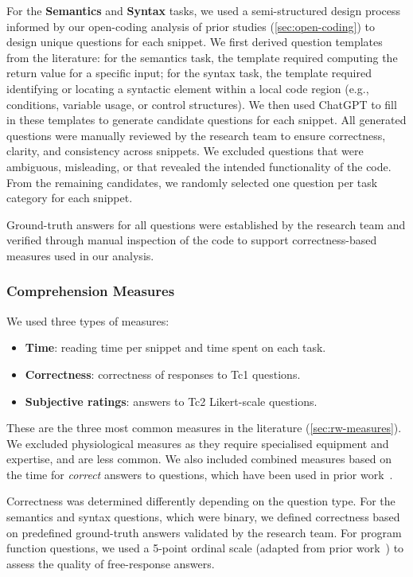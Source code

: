 For the \textbf{Semantics} and \textbf{Syntax} tasks, we used a semi-structured design process informed by our open-coding analysis of prior studies (\cref{sec:open-coding})
to design unique questions for each snippet.
We first derived question templates from the literature:
for the semantics task, the template required computing the return value for a specific input;
for the syntax task, the template required identifying or locating a syntactic element within a local code region (e.g., conditions, variable usage, or control structures).
We then used ChatGPT to fill in these templates to generate candidate questions for each snippet. All generated questions were manually reviewed by the research team to ensure correctness, clarity, and consistency across snippets. 
We excluded questions that were ambiguous, misleading, or that revealed the intended functionality of the code. 
From the remaining candidates, we randomly selected one question per task category for each snippet.





Ground-truth answers for all questions were established by the research team and verified through manual inspection of the code to support correctness-based measures used in our analysis.


\subsubsection{Comprehension Measures}
\label{sec:our-measures}

We used three types of measures:
\begin{itemize}
    \item \textbf{Time}: reading time per snippet and time spent on each task.
    \item \textbf{Correctness}: correctness of responses to Tc1 questions.
    \item \textbf{Subjective ratings}: answers to Tc2 Likert-scale questions.
\end{itemize}
These are the three most common measures in the literature (\cref{sec:rw-measures}).
We excluded physiological measures as they require
specialised equipment and expertise, and are less common.
We also included combined measures based on the time for \emph{correct} answers to questions, which have been used in prior work~\cite{33-9, von1995program}.

Correctness was determined differently depending on the question type. 
For the semantics and syntax questions, which were binary, we defined correctness based on predefined ground-truth answers validated by the research team. 
For program function questions, we used a 5-point ordinal scale (adapted from prior work~\cite{S87}) to assess the quality of free-response answers.

